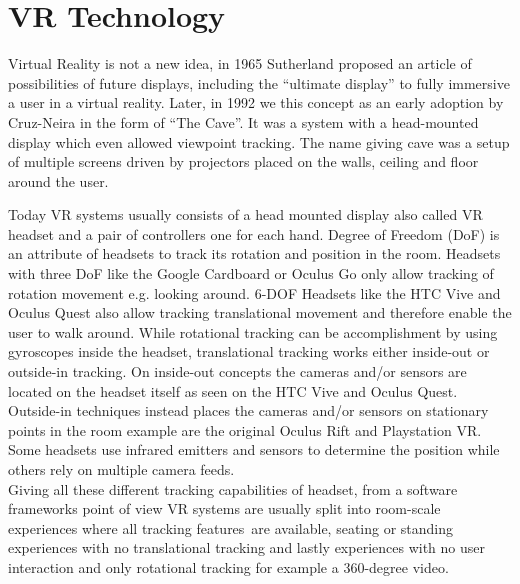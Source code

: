 


\section{VR Technology}

Virtual Reality is not a new idea, in 1965 Sutherland \cite{Sutherland65theultimate} proposed an article of possibilities of future displays, including the “ultimate display” to fully immersive a user in a virtual reality. Later, in 1992 we this concept as an early adoption by Cruz-Neira \cite{cruz-neira_cave_1992} in the form of “The Cave”. It was a system with a head-mounted display which even allowed viewpoint tracking. The name giving cave was a setup of multiple screens driven by projectors placed on the walls, ceiling and floor around the user.

Today VR systems usually consists of a head mounted display also called VR headset and a pair of controllers one for each hand. 
Degree of Freedom (DoF) is an attribute of headsets to track its rotation and position in the room. Headsets with three DoF like the Google Cardboard or Oculus Go only allow tracking of rotation movement e.g. looking around. 6-DOF Headsets like the HTC Vive and Oculus Quest also allow tracking translational movement and therefore enable the user to walk around. 
While rotational tracking can be accomplishment by using gyroscopes inside the headset, translational tracking works either inside-out or outside-in tracking. On inside-out concepts the cameras and/or sensors are located on the headset itself as seen on the HTC Vive and Oculus Quest. Outside-in techniques instead places the cameras and/or sensors on stationary points in the room example are the original Oculus Rift and Playstation VR.
Some headsets use infrared emitters and sensors to determine the position while others rely on multiple camera feeds.\\
Giving all these different tracking capabilities of headset, from a software frameworks point of view VR systems are usually split into room-scale experiences where all tracking features are available, seating or standing experiences with no translational tracking and lastly experiences with no user interaction and only rotational tracking for example a 360-degree video. 

